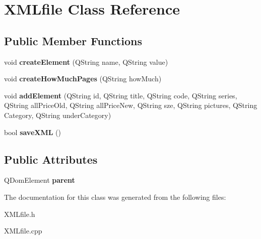 \hypertarget{class_x_m_lfile}{}\section{X\+M\+Lfile Class Reference}
\label{class_x_m_lfile}
\subsection*{Public Member Functions}
\begin{DoxyCompactItemize}
\item 
\mbox{\label{class_x_m_lfile_ad529c583178da61c4306af7b284605cd}} 
void {\bfseries create\+Element} (Q\+String name, Q\+String value)
\item 
\mbox{\label{class_x_m_lfile_a3ebdb0c8c03a6b5d054f9a507dfc814e}} 
void {\bfseries create\+How\+Much\+Pages} (Q\+String how\+Much)
\item 
\mbox{\label{class_x_m_lfile_a3a60f31948d43ddbd164d55e9abdae6e}} 
void {\bfseries add\+Element} (Q\+String id, Q\+String title, Q\+String code, Q\+String series, Q\+String all\+Price\+Old, Q\+String all\+Price\+New, Q\+String sze, Q\+String pictures, Q\+String Category, Q\+String under\+Category)
\item 
\mbox{\label{class_x_m_lfile_afa6ca4813699f9708f8c3a8d04bdfcb4}} 
bool {\bfseries save\+X\+ML} ()
\end{DoxyCompactItemize}
\subsection*{Public Attributes}
\begin{DoxyCompactItemize}
\item 
\mbox{\label{class_x_m_lfile_aed759137b6f60230e220204872ef38bf}} 
Q\+Dom\+Element {\bfseries parent}
\end{DoxyCompactItemize}


The documentation for this class was generated from the following files\+:\begin{DoxyCompactItemize}
\item 
X\+M\+Lfile.\+h\item 
X\+M\+Lfile.\+cpp\end{DoxyCompactItemize}

